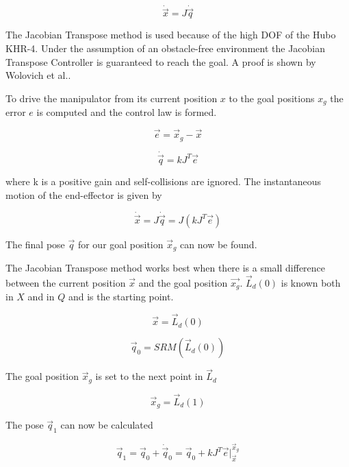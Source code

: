 \begin{equation}
\dot{\vec{x}} = J\dot{\vec{q}}
\end{equation}

  The Jacobian Transpose method is used because of the high DOF of the Hubo KHR-4.  Under the assumption of an obstacle-free environment the Jacobian Transpose Controller is guaranteed to reach the goal.  A proof is shown by Wolovich et al.\cite{4048118}.

To drive the manipulator from its current position $x$ to the goal positions $x_g$ the error $e$ is computed and the control law is formed.

\begin{equation}
\vec{e} = \vec{x}_g - \vec{x}
\end{equation}

\begin{equation}
\dot{\vec{q}} = kJ^T\vec{e}
\end{equation}

where k is a positive gain and self-collisions are ignored.  The instantaneous motion of the end-effector is given by

\begin{equation}
\dot{\vec{x}} = J\dot{\vec{q}} = J(kJ^T\vec{e})
\end{equation}

The final pose $\vec{q}$ for our goal position $\vec{x}_g$ can now be found.

The Jacobian Transpose method works best when there is a small difference between the current position $\vec{x}$ and the goal position $\vec{x_g}$.  $\vec{L}_d(0)$ is known both in $X$ and in $Q$ and is the starting point.

\begin{equation}
\vec{x} = \vec{L}_d(0)
\end{equation}

\begin{equation}
\vec{q}_0 = SRM  \left( \vec{L}_d(0) \right)
\end{equation}

The goal position $\vec{x}_g$ is set to the next point in $\vec{L}_d$

\begin{equation}
\vec{x}_g = \vec{L}_d(1)
\end{equation}

The pose $\vec{q}_1$ can now be calculated

\begin{equation}
\vec{q}_1 = \vec{q}_0 + \dot{\vec{q}}_0 = \vec{q}_0 + kJ^T\vec{e}|_{\vec{x}}^{\vec{x}_g}
\end{equation}

